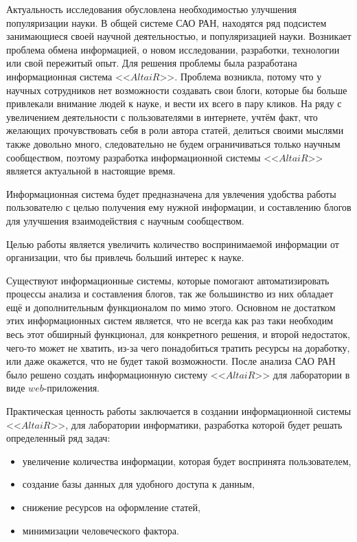 Актуальность исследования обусловлена необходимостью улучшения популяризации науки. В общей системе САО РАН, находятся ряд подсистем занимающиеся своей научной деятельностью, и популяризацией науки. Возникает проблема обмена информацией, о новом исследовании, разработки, технологии или свой пережитый опыт. Для решения проблемы была разработана информационная система <<$AltaiR$>>. Проблема возникла, потому что у научных сотрудников нет возможности создавать свои блоги, которые бы больше привлекали внимание людей к науке, и вести их всего в пару кликов. На ряду с увеличением деятельности с пользователями в интернете, учтём факт, что желающих прочувствовать себя в роли автора статей, делиться своими мыслями также довольно много, следовательно не будем ограничиваться только научным сообществом, поэтому разработка информационной системы <<$AltaiR$>> является актуальной в настоящие время.

Информационная система будет предназначена для увлечения удобства работы пользователю с целью получения ему нужной информации, и составлению блогов для улучшения взаимодействия с научным сообществом.

Целью работы является увеличить количество воспринимаемой информации от организации, что бы привлечь больший интерес к науке. 

Существуют информационные системы, которые помогают автоматизировать процессы анализа и составления блогов, так же большинство из них обладает ещё и дополнительным функционалом по мимо этого. Основном не достатком этих информационных систем является, что не всегда как раз таки необходим весь этот обширный функционал, для конкретного решения, и второй недостаток, чего-то может не хватить, из-за чего понадобиться тратить ресурсы на доработку, или даже окажется, что не будет такой возможности. После анализа САО РАН было решено создать информационную систему <<$AltaiR$>> для лаборатории в виде $web$-приложения.

Практическая ценность работы заключается в создании информационной системы <<$AltaiR$>>, для лаборатории информатики, разработка которой будет решать определенный ряд задач:
\begin{itemize}
	\item увеличение количества информации, которая будет воспринята пользователем,
	\item создание базы данных для удобного доступа к данным,
	\item снижение ресурсов на оформление статей,
	\item минимизации человеческого фактора.
\end{itemize}


